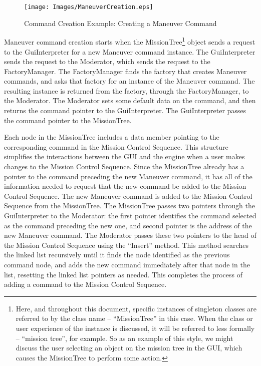 \begin{landscape}
\begin{figure}[htb]
\begin{center}
\texttt{[image: Images/ManeuverCreation.eps]}
\caption{\label{figure:ManeuverCreation}Command Creation Example: Creating a Maneuver Command}
\end{center}
\end{figure}
\end{landscape}

Maneuver command creation starts when the MissionTree\footnote{Here, and throughout this document,
specific instances of singleton classes are referred to by the class name -- ``MissionTree'' in this
case.  When the class or user experience of the instance is discussed, it will be referred to
 less formally -- ``mission tree'', for example.  So as an example of this style, we might discuss
the user selecting an object on the mission tree in the GUI, which causes the MissionTree to perform
some action.} object sends a request to the GuiInterpreter for a new Maneuver command instance. The
GuiInterpreter sends the request to the Moderator, which sends the request to the FactoryManager.
The FactoryManager finds the factory that creates Maneuver commands, and asks that factory for an
instance of the Maneuver command.  The resulting instance is returned from the factory, through the
FactoryManager, to the Moderator.  The Moderator sets some default data on the command, and then
returns the command pointer to the GuiInterpreter. The GuiInterpreter passes the command pointer to
the MissionTree.

Each node in the MissionTree includes a data member pointing to the corresponding command in the
Mission Control Sequence.  This structure simplifies the interactions between the GUI and the engine
when a user makes changes to the Mission Control Sequence.  Since the MissionTree already has a
pointer to the command preceding the new Maneuver command, it has all of the information needed to
request that the new command be added to the Mission Control Sequence.  The new Maneuver command is
added to the Mission Control Sequence from the MissionTree.  The MissionTree passes two pointers
through the GuiInterpreter to the Moderator: the first pointer identifies the command selected as
the command preceding the new one, and second pointer is the address of the new Maneuver command.
The Moderator passes these two pointers to the head of the Mission Control Sequence using the
``Insert'' method. This method searches the linked list recursively until it finds the node
identified as the previous command node, and adds the new command immediately after that node in the
list, resetting the linked list pointers as needed.  This completes the process of adding a command
to the Mission Control Sequence.

